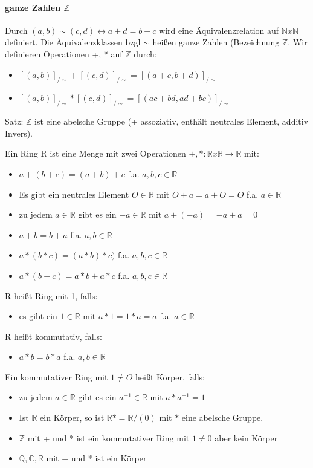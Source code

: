 \documentclass[10pt,landscape]{article}
\begin{document}
\begin{multicols}{3}
\paragraph{ganze Zahlen $\mathbb{Z}$}
Durch $(a,b)\sim (c,d)\leftrightarrow a+d=b+c$ wird eine Äquivalenzrelation auf $\mathbb{N} x\mathbb{N}$ definiert.
Die Äquivalenzklassen bzgl $\sim$ heißen ganze Zahlen (Bezeichnung $\mathbb{Z}$. Wir definieren Operationen +, * auf $\mathbb{Z}$ durch:
\begin{itemize}
    \item $[(a,b)]_{/\sim } + [(c,d)]_{/\sim } = [(a+c, b+d)]_{/\sim }$
    \item $[(a,b)]_{/\sim } * [(c,d)]_{/\sim } = [(ac+bd, ad+bc)]_{/\sim }$
\end{itemize}
Satz: $\mathbb{Z}$ ist eine abelsche Gruppe (+ assoziativ, enthält neutrales Element, additiv Invers).

Ein Ring R ist eine Menge mit zwei Operationen $+,*: \mathbb{R} x \mathbb{R} \rightarrow \mathbb{R}$ mit:
\begin{itemize}
    \item $a+(b+c) = (a+b)+c$ f.a. $a,b,c\in \mathbb{R}$
    \item Es gibt ein neutrales Element $O\in \mathbb{R}$ mit $O+a=a+O=O$ f.a. $a\in\mathbb{R}$
    \item zu jedem $a\in \mathbb{R}$ gibt es ein $-a\in \mathbb{R}$ mit $a+(-a)=-a+a=0$
    \item $a+b=b+a$ f.a. $a,b\in\mathbb{R}$
    \item $a*(b*c)=(a*b)*c)$ f.a. $a,b,c\in\mathbb{R}$
    \item $a*(b+c)=a*b+a*c$ f.a. $a,b,c\in\mathbb{R}$
\end{itemize}
R heißt Ring mit 1, falls:
\begin{itemize} 
    \item es gibt ein $1\in\mathbb{R}$ mit $a*1=1*a=a$ f.a. $a\in\mathbb{R}$
\end{itemize}
R heißt kommutativ, falls:
\begin{itemize}
    \item $a*b=b*a$ f.a. $a,b\in\mathbb{R}$
\end{itemize}
Ein kommutativer Ring mit $1\not=O$ heißt Körper, falls:
\begin{itemize}
    \item zu jedem $a\in\mathbb{R}$ gibt es ein $a^{-1}\in\mathbb{R}$ mit $a*a^{-1}=1$
\end{itemize}

\begin{itemize}
    \item Ist $\mathbb{R}$ ein Körper, so ist $\mathbb{R}*=\mathbb{R} /(0)$ mit $*$ eine abelsche Gruppe.
    \item $\mathbb{Z}$ mit + und * ist ein kommutativer Ring mit $1 \not= 0$ aber kein Körper
    \item $\mathbb{Q}, \mathbb{C}, \mathbb{R}$ mit + und * ist ein Körper
\end{itemize}


\end{multicols}
\end{document}
